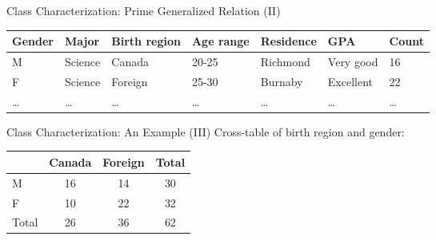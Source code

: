 \begin{frame}{Class Characterization: Prime Generalized Relation (II)}
  \begin{table}
    \begin{tabularx}{\textwidth}{|X|X|X|X|X|X|X|}
      \hline
      \textbf{Gender} & \textbf{Major} & \textbf{Birth region} & \textbf{Age range} & \textbf{Residence} & \textbf{GPA} & \textbf{Count} \\\hline
      M & Science & Canada & 20-25 & Richmond & Very good & 16 \\\hline
      F & Science & Foreign & 25-30 & Burnaby & Excellent & 22 \\\hline
      \ldots & \ldots & \ldots & \ldots & \ldots & \ldots & \ldots \\
      \hline
    \end{tabularx}
  \end{table}
\end{frame}

\begin{frame}{Class Characterization: An Example (III)}
  \centering
  Cross-table of birth region and gender:\\[0.5cm]
  \begin{tabular}{|l|c|c|c|}
    \hline
    & Canada & Foreign & Total \\\hline
    M & 16 & 14 & 30 \\\hline
    F & 10 & 22 & 32 \\\hline
    Total & 26 & 36 & 62 \\\hline
  \end{tabular}
\end{frame}

